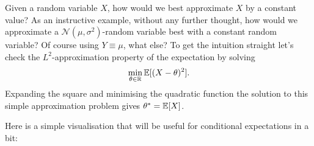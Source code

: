 	
\begin{lstep}
Given a random variable $X$, how would we best approximate $X$ by a constant value? As an instructive example, without any further thought, how would we approximate a $\mathcal N(\mu,\sigma^2)$-random variable best with a constant random variable? Of course using $Y\equiv \mu$, what else? To get the intuition straight let's check the $L^2$-approximation property of the expectation by solving
\begin{align*}
	\min_{\theta\in\mathbb{R}} \mathbb{E}[(X-\theta)^2].
\end{align*}
Expanding the square and minimising the quadratic function the solution to this simple approximation problem gives $\theta^*=\mathbb{E}[X]$. 
\end{lstep}
Here is a simple visualisation that will be useful for conditional expectations in a bit:


